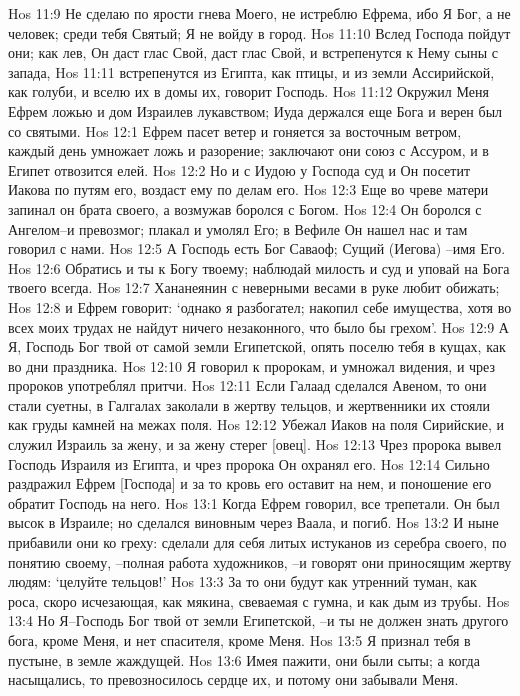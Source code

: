 Hos 11:9  Не сделаю по ярости гнева Моего, не истреблю Ефрема, ибо Я Бог, а не человек; среди тебя Святый; Я не войду в город.
Hos 11:10  Вслед Господа пойдут они; как лев, Он даст глас Свой, даст глас Свой, и встрепенутся к Нему сыны с запада,
Hos 11:11  встрепенутся из Египта, как птицы, и из земли Ассирийской, как голуби, и вселю их в домы их, говорит Господь.
Hos 11:12  Окружил Меня Ефрем ложью и дом Израилев лукавством; Иуда держался еще Бога и верен был со святыми.
Hos 12:1  Ефрем пасет ветер и гоняется за восточным ветром, каждый день умножает ложь и разорение; заключают они союз с Ассуром, и в Египет отвозится елей.
Hos 12:2  Но и с Иудою у Господа суд и Он посетит Иакова по путям его, воздаст ему по делам его.
Hos 12:3  Еще во чреве матери запинал он брата своего, а возмужав боролся с Богом.
Hos 12:4  Он боролся с Ангелом--и превозмог; плакал и умолял Его; в Вефиле Он нашел нас и там говорил с нами.
Hos 12:5  А Господь есть Бог Саваоф; Сущий (Иегова) --имя Его.
Hos 12:6  Обратись и ты к Богу твоему; наблюдай милость и суд и уповай на Бога твоего всегда.
Hos 12:7  Хананеянин с неверными весами в руке любит обижать;
Hos 12:8  и Ефрем говорит: `однако я разбогател; накопил себе имущества, хотя во всех моих трудах не найдут ничего незаконного, что было бы грехом'.
Hos 12:9  А Я, Господь Бог твой от самой земли Египетской, опять поселю тебя в кущах, как во дни праздника.
Hos 12:10  Я говорил к пророкам, и умножал видения, и чрез пророков употреблял притчи.
Hos 12:11  Если Галаад сделался Авеном, то они стали суетны, в Галгалах заколали в жертву тельцов, и жертвенники их стояли как груды камней на межах поля.
Hos 12:12  Убежал Иаков на поля Сирийские, и служил Израиль за жену, и за жену стерег [овец].
Hos 12:13  Чрез пророка вывел Господь Израиля из Египта, и чрез пророка Он охранял его.
Hos 12:14  Сильно раздражил Ефрем [Господа] и за то кровь его оставит на нем, и поношение его обратит Господь на него.
Hos 13:1  Когда Ефрем говорил, все трепетали. Он был высок в Израиле; но сделался виновным через Ваала, и погиб.
Hos 13:2  И ныне прибавили они ко греху: сделали для себя литых истуканов из серебра своего, по понятию своему, --полная работа художников, --и говорят они приносящим жертву людям: `целуйте тельцов!'
Hos 13:3  За то они будут как утренний туман, как роса, скоро исчезающая, как мякина, свеваемая с гумна, и как дым из трубы.
Hos 13:4  Но Я--Господь Бог твой от земли Египетской, --и ты не должен знать другого бога, кроме Меня, и нет спасителя, кроме Меня.
Hos 13:5  Я признал тебя в пустыне, в земле жаждущей.
Hos 13:6  Имея пажити, они были сыты; а когда насыщались, то превозносилось сердце их, и потому они забывали Меня.
